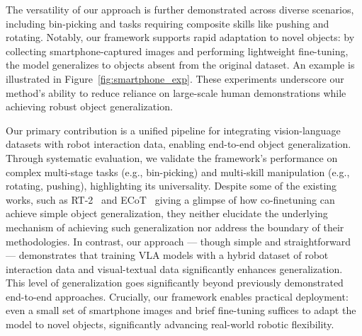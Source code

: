 The versatility of our approach is further demonstrated across diverse scenarios, including bin-picking and tasks requiring composite skills like pushing and rotating. Notably, our framework supports rapid adaptation to novel objects: by collecting smartphone-captured images and performing lightweight fine-tuning, the model generalizes to objects absent from the original dataset. An example is illustrated in Figure~\ref{fig:smartphone_exp}. These experiments underscore our method’s ability to reduce reliance on large-scale human demonstrations while achieving robust object generalization.

Our primary contribution is a unified pipeline for integrating vision-language datasets with robot interaction data, enabling end-to-end object generalization. Through systematic evaluation, we validate the framework’s performance on complex multi-stage tasks (e.g., bin-picking) and multi-skill manipulation (e.g., rotating, pushing), highlighting its universality. Despite some of the existing works, such as RT-2~\cite{rt-2} and ECoT~\cite{ecot} giving a glimpse of how co-finetuning can achieve simple object generalization, they neither elucidate the underlying mechanism of achieving such generalization nor address the boundary of their methodologies. In contrast, our approach — though simple and straightforward — demonstrates that training VLA models with a hybrid dataset of robot interaction data and visual-textual data significantly enhances generalization. This level of generalization goes significantly beyond previously demonstrated end-to-end approaches. Crucially, our framework enables practical deployment: even a small set of smartphone images and brief fine-tuning suffices to adapt the model to novel objects, significantly advancing real-world robotic flexibility.

